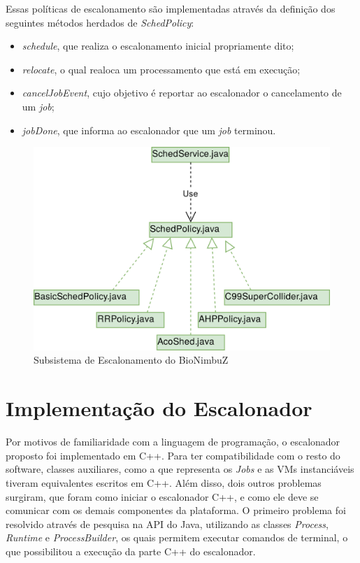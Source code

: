 Essas políticas de escalonamento são implementadas através da definição dos seguintes métodos herdados de \textit{SchedPolicy}:
\begin{itemize}
	\item \textit{schedule}, que realiza o escalonamento inicial propriamente dito;
	\item \textit{relocate}, o qual realoca um processamento que está em execução;
	\item \textit{cancelJobEvent}, cujo objetivo é reportar ao escalonador o cancelamento de um \textit{job};
	\item \textit{jobDone}, que informa ao escalonador que um \textit{job} terminou.
\end{itemize}

\begin{figure}[htbp]
	\centerline{\includegraphics[width=12cm]{img/ArquiteturaAntesHoriz.png}}
	\caption{Subsistema de Escalonamento do BioNimbuZ}
	\label{ArquiteturaAtual}
\end{figure}


\section{Implementação do Escalonador}

Por motivos de familiaridade com a linguagem de programação, o escalonador proposto foi implementado em C++. Para ter compatibilidade com o resto do software, classes auxiliares, como a que representa os \textit{Jobs} e as \acrshort{VM}s instanciáveis tiveram equivalentes escritos em C++. Além disso, dois outros problemas surgiram, que foram como iniciar o escalonador C++, e como ele deve se comunicar com os demais componentes da plataforma. O primeiro problema foi resolvido através de pesquisa na \acrfull{API} do Java, utilizando as classes \textit{Process}\cite{JavaProcess}, \textit{Runtime}\cite{JavaRuntime} e \textit{ProcessBuilder}\cite{JavaProcessBuilder}, os quais permitem executar comandos de terminal, o que possibilitou a execução da parte C++ do escalonador.

